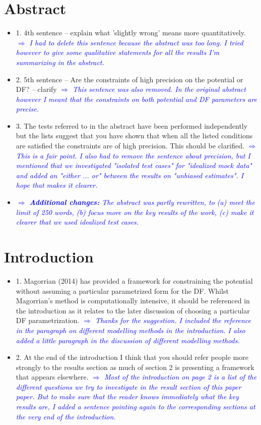 \documentclass[10pt,a4paper]{article}
\newcommand{\Comment}[1]{\textsl{\textcolor{Blue}{$\Longrightarrow$ {#1}}}}
\begin{document}
\section{Abstract}
\begin{itemize}
\item 1. 4th sentence -- explain what 'slightly wrong' means more quantitatively. \Comment{I had to delete this sentence because the abstract was too long. I tried however to give some qualitative statements for all the results I'm summarizing in the abstract.}
\item 2. 5th sentence -- Are the constraints of high precision on the potential or DF? -- clarify \Comment{This sentence was also removed. In the original abstract however I meant that the constraints on both potential and DF parameters are precise.}
\item 3. The tests referred to in the abstract have been performed independently but the lists suggest that you have shown that when all the listed conditions are satisfied the constraints are of high precision. This should be clarified. \Comment{This is a fair point. I also had to remove the sentence about precision, but I mentioned that we investigated "isolated test cases" for "idealized mock data" and added an "either ... or" between the results on "unbiased estimates". I hope that makes it clearer.}
\item \Comment{\textbf{Additional changes:} The abstract was partly rewritten, to (a) meet the limit of 250 words, (b) focus more on the key results of the work, (c) make it clearer that we used idealized test cases.}
\end{itemize}

\section{Introduction}
\begin{itemize}
\item 1. Magorrian (2014) has provided a framework for constraining the potential without assuming a particular parametrized form for the DF. Whilst Magorrian's method is computationally intensive, it should be referenced in the introduction as it relates to the later discussion of choosing a particular DF parametrization. \Comment{Thanks for the suggestion. I included the reference in the paragraph on different modelling methods in the introduction. I also added a little paragraph in the discussion of different modelling methods.}
\item 2. At the end of the introduction I think that you should refer people more strongly to the results section as much of section 2 is presenting a framework that appears elsewhere. \Comment{Most of the introduction on page 2 is a list of the different questions we try to investigate in the result section of this paper paper. But to make sure that the reader knows immediately what the key results are, I added a sentence pointing again to the corresponding sections at the very end of the introduction.}
\end{itemize}
\end{document}
